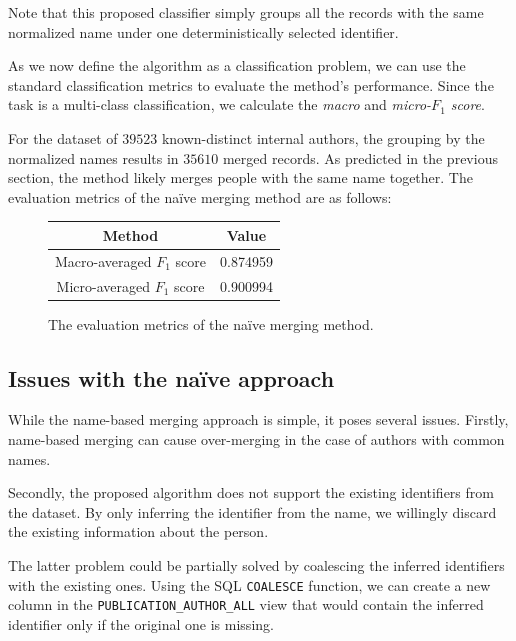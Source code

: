 Note that this proposed classifier simply groups all the records with the same normalized name under one deterministically selected identifier.

As we now define the algorithm as a classification problem, we can use the standard classification metrics to evaluate the method's performance.
Since the task is a multi-class classification, we calculate the \textit{macro} and \textit{micro-$F_1$ score}.

For the dataset of $39523$ known-distinct internal authors, the grouping by the normalized names results in $35610$ merged records.
As predicted in the previous section, the method likely merges people with the same name together.
The evaluation metrics of the naïve merging method are as follows:

\begin{figure}[!ht]
    \captionsetup{width=.9\linewidth}
    \centering
    \begin{tabular}{|c|c|}
    \hline
        \textbf{Method} & \textbf{Value} \\ \hline
        Macro-averaged $F_1$ score & 0.874959 \\ \hline
        Micro-averaged $F_1$ score & 0.900994 \\ \hline
    \end{tabular}
    \caption{The evaluation metrics of the naïve merging method\protect\footnotemark.}
\end{figure}


\subsection{Issues with the naïve approach}

While the name-based merging approach is simple, it poses several issues.
Firstly, name-based merging can cause over-merging in the case of authors with common names.

Secondly, the proposed algorithm does not support the existing identifiers from the dataset.
By only inferring the identifier from the name, we willingly discard the existing information about the person.

The latter problem could be partially solved by coalescing the inferred identifiers with the existing ones.
Using the SQL \texttt{COALESCE} function, we can create a new column in the \texttt{PUBLICATION\_AUTHOR\_ALL} view that would contain the inferred identifier only if the original one is missing.

